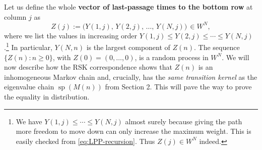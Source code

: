 \documentclass[letterpaper,11pt,oneside,reqno]{article}
\numberwithin{equation}{section}
\theoremstyle{definition}
\begin{document}
Let us define the whole \textbf{vector of last-passage times to the bottom row} at column $j$ as
\[ Z(j) := \big( Y(1,j),\, Y(2,j),\, \dots,\, Y(N,j)\big)\,\in W^N, \]
where we list the values in increasing order $Y(1,j)\le Y(2,j)\le \cdots \le Y(N,j)$.\footnote{We have $Y(1,j)\le \cdots\le Y(N,j)$ almost surely because giving the path more freedom to move down can only increase the maximum weight. This is easily checked from \eqref{eq:LPP-recursion}. Thus $Z(j)\in W^N$ indeed.} In particular, $Y(N,n)$ is the largest component of $Z(n)$. The sequence $\{Z(n):n\ge0\}$, with $Z(0)=(0,\dots,0)$, is a random process in $W^N$. We will now describe how the RSK correspondence shows that $Z(n)$ is an inhomogeneous Markov chain and, crucially, has the \emph{same transition kernel} as the eigenvalue chain $\operatorname{sp}(M(n))$ from Section 2. This will pave the way to prove the equality in distribution.
\end{document}
